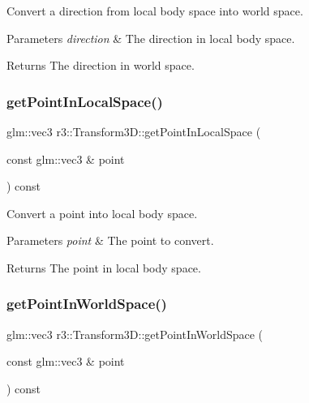 Convert a direction from local body space into world space. 


\begin{DoxyParams}{Parameters}
{\em direction} & The direction in local body space. \\
\hline
\end{DoxyParams}
\begin{DoxyReturn}{Returns}
The direction in world space. 
\end{DoxyReturn}
\mbox{\label{classr3_1_1_transform3_d_a7c6348081c8c1b4d36af89fa7fe2103d}} 
\subsubsection{\texorpdfstring{get\+Point\+In\+Local\+Space()}{getPointInLocalSpace()}}
{\footnotesize\ttfamily glm\+::vec3 r3\+::\+Transform3\+D\+::get\+Point\+In\+Local\+Space (\begin{DoxyParamCaption}\item[{const glm\+::vec3 \&}]{point }\end{DoxyParamCaption}) const}



Convert a point into local body space. 


\begin{DoxyParams}{Parameters}
{\em point} & The point to convert. \\
\hline
\end{DoxyParams}
\begin{DoxyReturn}{Returns}
The point in local body space. 
\end{DoxyReturn}
\mbox{\label{classr3_1_1_transform3_d_a4ecfb0e1518fbeaaa838da02402d0bd9}} 
\subsubsection{\texorpdfstring{get\+Point\+In\+World\+Space()}{getPointInWorldSpace()}}
{\footnotesize\ttfamily glm\+::vec3 r3\+::\+Transform3\+D\+::get\+Point\+In\+World\+Space (\begin{DoxyParamCaption}\item[{const glm\+::vec3 \&}]{point }\end{DoxyParamCaption}) const}



